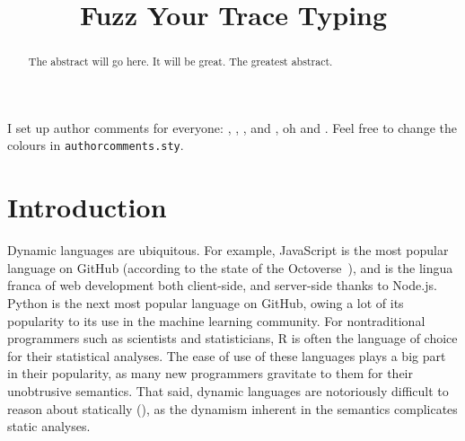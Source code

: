 \documentclass[sigplan,anonymous,review]{acmart}
\begin{document}
\title{\tool Fuzz Your Trace Typing}

\begin{abstract}
The abstract will go here.
It will be great.
The greatest abstract.

\end{abstract}

\maketitle

I set up author comments for everyone: , , , and , oh and . Feel free to change the
colours in {\tt authorcomments.sty}.



\section{Introduction}
\label{sec:introduction}

Dynamic languages are ubiquitous.
For example, JavaScript is the most popular language on GitHub (according to the state of the Octoverse~\cite{state-of-octoverse-2021}), and is the lingua franca of web development both client-side, and server-side thanks to Node.js.
Python is the next most popular language on GitHub, owing a lot of its popularity to its use in the machine learning community.
For nontraditional programmers such as scientists and statisticians, R is often the language of choice for their statistical analyses.
The ease of use of these languages plays a big part in their popularity, as many new programmers gravitate to them for their unobtrusive semantics.
That said, dynamic languages are notoriously difficult to reason about statically (), as the dynamism inherent in the semantics complicates static analyses.
\end{document}
